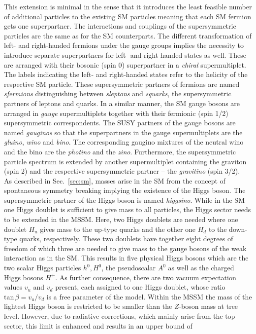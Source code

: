 This extension is minimal in the sense that it introduces the least feasible number of additional particles to the existing SM particles meaning that each SM fermion gets one superpartner. The interactions and couplings of the supersymmetric particles are the same as for the SM counterparts. The different transformation of left- and right-handed fermions under the gauge groups implies the necessity to introduce separate superpartners for left- and right-handed states as well. These are arranged with their bosonic (spin 0) superpartner in a \textit{chiral} supermultiplet. The labels indicating the left- and right-handed states refer to the helicity of the respective SM particle. These supersymmetric partners of fermions are named \textit{sfermions} distinguishing between \textit{sleptons} and \textit{squarks}, the supersymmetric partners of leptons and quarks. In a similar manner, the SM gauge bosons are arranged in \textit{gauge} supermultiplets together with their fermionic (spin 1/2) supersymmetric correspondents. The SUSY partners of the gauge bosons are named \textit{gauginos} so that the superpartners in the gauge supermultiplets are the \textit{gluino}, \textit{wino} and \textit{bino}. The corresponding gaugino mixtures of the neutral wino and the bino are the \textit{photino} and the \textit{zino}. Furthermore, the supersymmetric particle spectrum is extended by another supermultiplet containing the graviton (spin 2) and the respective supersymmetric partner -- the \textit{gravitino} (spin 3/2). \\
As described in Sec.~\ref{sec:sm}, masses arise in the SM from the concept of spontaneous symmetry breaking implying the existence of the Higgs boson. The supersymmetric partner of the Higgs boson is named \textit{higgsino}. While in the SM one Higgs doublet is sufficient to give mass to all particles, the Higgs sector needs to be extended in the MSSM. Here, two Higgs doublets are needed where one doublet $H_u$ gives mass to the up-type quarks and the other one $H_d$ to the down-type quarks, respectively. These two doublets have together eight degrees of freedom of which three are needed to give mass to the gauge bosons of the weak interaction as in the SM. This results in five physical Higgs bosons which are the two scalar Higgs particles $h^0, H^0$, the pseudoscalar $A^0$ as well as the charged Higgs bosons $H^{\pm}$. As further consequence, there are two vacuum expectation values $v_u$ and $v_d$ present, each assigned to one Higgs doublet, whose ratio $\mathrm{tan} \, \beta = v_u/v_d$ is a free parameter of the model. Within the MSSM the mass of the lightest Higgs boson is restricted to be smaller than the $Z$-boson mass at tree level. However, due to radiative corrections, which mainly arise from the top sector, this limit is enhanced and results in an upper bound of~\cite{Martin:1997ns} 
